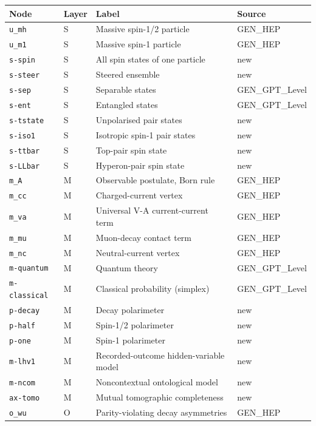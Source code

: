 \begin{ruledtabular}
\begin{tabular}{llll}
Node & Layer & Label & Source \\
\hline
\texttt{u\_mh} & S & Massive spin-1/2 particle & GEN\_HEP \\
\texttt{u\_m1} & S & Massive spin-1 particle & GEN\_HEP \\
\texttt{s-spin} & S & All spin states of one particle & new \\
\texttt{s-steer} & S & Steered ensemble & new \\
\texttt{s-sep} & S & Separable states & GEN\_GPT\_Level \\
\texttt{s-ent} & S & Entangled states & GEN\_GPT\_Level \\
\texttt{s-tstate} & S & Unpolarised pair states & new \\
\texttt{s-iso1} & S & Isotropic spin-1 pair states & new \\
\texttt{s-ttbar} & S & Top-pair spin state & new \\
\texttt{s-LLbar} & S & Hyperon-pair spin state & new \\
\texttt{m\_A} & M & Observable postulate, Born rule & GEN\_HEP \\
\texttt{m\_cc} & M & Charged-current vertex & GEN\_HEP \\
\texttt{m\_va} & M & Universal V-A current-current term & GEN\_HEP \\
\texttt{m\_mu} & M & Muon-decay contact term & GEN\_HEP \\
\texttt{m\_nc} & M & Neutral-current vertex & GEN\_HEP \\
\texttt{m-quantum} & M & Quantum theory & GEN\_GPT\_Level \\
\texttt{m-classical} & M & Classical probability (simplex) & GEN\_GPT\_Level \\
\texttt{p-decay} & M & Decay polarimeter & new \\
\texttt{p-half} & M & Spin-1/2 polarimeter & new \\
\texttt{p-one} & M & Spin-1 polarimeter & new \\
\texttt{m-lhv1} & M & Recorded-outcome hidden-variable model & new \\
\texttt{m-ncom} & M & Noncontextual ontological model & new \\
\texttt{ax-tomo} & M & Mutual tomographic completeness & new \\
\texttt{o\_wu} & O & Parity-violating decay asymmetries & GEN\_HEP \\

\end{tabular}
\end{ruledtabular}
